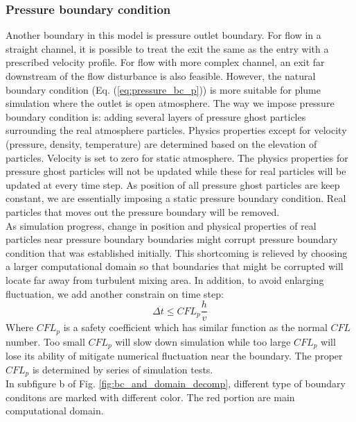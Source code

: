 \documentclass[journal abbreviation, manuscript]{copernicus}
\begin{document}
\subsubsection{Pressure boundary condition}
Another boundary in this model is pressure outlet boundary. For flow in a straight channel, it is possible to treat the exit the same as the entry with a prescribed velocity profile. For flow with more complex channel, an exit far downstream of the flow disturbance is also feasible. However, the natural boundary condition (Eq.  (\ref{eq:pressure_bc_p})) is more suitable for plume simulation where the outlet is open atmosphere. The way we impose pressure boundary condition is: adding several layers of pressure ghost particles surrounding the real atmosphere particles. Physics properties except for velocity (pressure, density, temperature) are determined based on the elevation of particles. Velocity is set to zero for static atmosphere. The physics properties for pressure ghost particles will not be updated while these for real particles will be updated at every time step. As position of all pressure ghost particles are keep constant, we are essentially imposing a static pressure boundary condition. Real particles that moves out the pressure boundary will be removed.\\
As simulation progress, change in position and physical properties of real particles near pressure boundary boundaries might corrupt pressure boundary condition that was established initially. This shortcoming is relieved by choosing a larger computational domain so that boundaries that might be corrupted will locate far away from turbulent mixing area. In addition, to avoid enlarging fluctuation, we add another constrain on time step: 
\begin{equation}
\Delta t \leq CFL_p \dfrac{h}{v}
\end{equation}
Where $CFL_p$ is a safety coefficient which has similar function as the normal $CFL$ number. Too small $CFL_p$ will slow down simulation while too large $CFL_p$ will lose its ability of mitigate numerical fluctuation near the boundary. The proper $CFL_p$ is determined by series of simulation tests. \\
In subfigure b of Fig. \ref{fig:bc_and_domain_decomp}, different type of boundary conditons are marked with different color. The red portion are main computational domain. 
\end{document}
